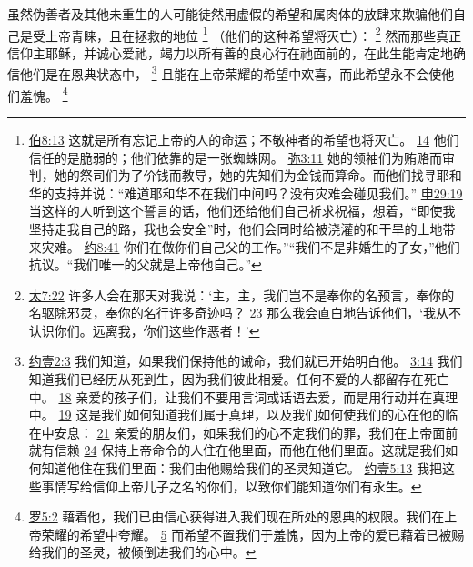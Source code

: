 \documentclass[12pt, a4paper, oneside]{ctexart}
\newcounter{parnum}[section]
\newcommand{\N}{%
   \noindent\refstepcounter{parnum}%
    \makebox[\parindent][l]{\textbf{\arabic{parnum}.}}}
\begin{document}
\N 虽然伪善者及其他未重生的人可能徒然用虚假的希望和属肉体的放肆来欺骗他们自己是受上帝青睐，且在拯救的地位
	\footnote {
		\href{https://biblehub.com/job/8-13.htm}{伯8:13} 这就是所有忘记上帝的人的命运；不敬神者的希望也将灭亡。
		\href{https://biblehub.com/job/8-14.htm}{14} 他们信任的是脆弱的；他们依靠的是一张蜘蛛网。
		\href{https://biblehub.com/micah/3-11.htm}{弥3:11} 她的领袖们为贿赂而审判，她的祭司们为了价钱而教导，她的先知们为金钱而算命。而他们找寻耶和华的支持并说：“难道耶和华不在我们中间吗？没有灾难会碰见我们。”
		\href{https://biblehub.com/deuteronomy/29-19.htm}{申29:19} 当这样的人听到这个誓言的话，他们还给他们自己祈求祝福，想着，“即使我坚持走我自己的路，我也会安全”时，他们会同时给被浇灌的和干旱的土地带来灾难。
		\href{https://biblehub.com/john/8-41.htm}{约8:41} 你们在做你们自己父的工作。”“我们不是非婚生的子女，”他们抗议。“我们唯一的父就是上帝他自己。”
	}
	（他们的这种希望将灭亡）：
	\footnote {
		\href{https://biblehub.com/matthew/7-22.htm}{太7:22} 许多人会在那天对我说：‘主，主，我们岂不是奉你的名预言，奉你的名驱除邪灵，奉你的名行许多奇迹吗？
		\href{https://biblehub.com/matthew/7-23.htm}{23} 那么我会直白地告诉他们，‘我从不认识你们。远离我，你们这些作恶者！’
	}
	然而那些真正信仰主耶稣，并诚心爱祂，竭力以所有善的良心行在祂面前的，在此生能肯定地确信他们是在恩典状态中，
	\footnote {
		\href{https://biblehub.com/1_john/2-3.htm}{约壹2:3} 我们知道，如果我们保持他的诫命，我们就已开始明白他。
		\href{https://biblehub.com/1_john/3-14.htm}{3:14} 我们知道我们已经历从死到生，因为我们彼此相爱。任何不爱的人都留存在死亡中。
		\href{https://biblehub.com/1_john/3-18.htm}{18} 亲爱的孩子们，让我们不要用言词或话语去爱，而是用行动并在真理中。
		\href{https://biblehub.com/1_john/3-19.htm}{19} 这是我们如何知道我们属于真理，以及我们如何使我们的心在他的临在中安息：
		\href{https://biblehub.com/1_john/3-21.htm}{21} 亲爱的朋友们，如果我们的心不定我们的罪，我们在上帝面前就有信赖
		\href{https://biblehub.com/1_john/3-24.htm}{24} 保持上帝命令的人住在他里面，而他在他们里面。这就是我们如何知道他住在我们里面：我们由他赐给我们的圣灵知道它。
		\href{https://biblehub.com/1_john/5-13.htm}{约壹5:13} 我把这些事情写给信仰上帝儿子之名的你们，以致你们能知道你们有永生。
	}
	且能在上帝荣耀的希望中欢喜，而此希望永不会使他们羞愧。
	\footnote {
		\href{https://biblehub.com/romans/5-2.htm}{罗5:2} 藉着他，我们已由信心获得进入我们现在所处的恩典的权限。我们在上帝荣耀的希望中夸耀。
		\href{https://biblehub.com/romans/5-5.htm}{5} 而希望不置我们于羞愧，因为上帝的爱已藉着已被赐给我们的圣灵，被倾倒进我们的心中。
	}
\end{document}
